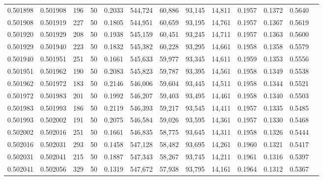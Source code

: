 \begin{tabular}{rrrrrrrrrrrrr}
0.501898 & 0.501908 & 196 &  50 &                                     0.2033 & 544,724 &  60,886 &  93,145 &  14,811 & 0.1957 & 0.1372 & 0.5640 \\
0.501908 & 0.501919 & 227 &  50 &                                     0.1805 & 544,951 &  60,659 &  93,195 &  14,761 & 0.1957 & 0.1367 & 0.5619 \\
0.501920 & 0.501929 & 208 &  50 &                                     0.1938 & 545,159 &  60,451 &  93,245 &  14,711 & 0.1957 & 0.1363 & 0.5600 \\
0.501929 & 0.501940 & 223 &  50 &                                     0.1832 & 545,382 &  60,228 &  93,295 &  14,661 & 0.1958 & 0.1358 & 0.5579 \\
0.501940 & 0.501951 & 251 &  50 &                                     0.1661 & 545,633 &  59,977 &  93,345 &  14,611 & 0.1959 & 0.1353 & 0.5556 \\
0.501951 & 0.501962 & 190 &  50 &                                     0.2083 & 545,823 &  59,787 &  93,395 &  14,561 & 0.1958 & 0.1349 & 0.5538 \\
0.501962 & 0.501972 & 183 &  50 &                                     0.2146 & 546,006 &  59,604 &  93,445 &  14,511 & 0.1958 & 0.1344 & 0.5521 \\
0.501972 & 0.501983 & 201 &  50 &                                     0.1992 & 546,207 &  59,403 &  93,495 &  14,461 & 0.1958 & 0.1340 & 0.5503 \\
0.501983 & 0.501993 & 186 &  50 &                                     0.2119 & 546,393 &  59,217 &  93,545 &  14,411 & 0.1957 & 0.1335 & 0.5485 \\
0.501993 & 0.502002 & 191 &  50 &                                     0.2075 & 546,584 &  59,026 &  93,595 &  14,361 & 0.1957 & 0.1330 & 0.5468 \\
0.502002 & 0.502016 & 251 &  50 &                                     0.1661 & 546,835 &  58,775 &  93,645 &  14,311 & 0.1958 & 0.1326 & 0.5444 \\
0.502016 & 0.502031 & 293 &  50 &                                     0.1458 & 547,128 &  58,482 &  93,695 &  14,261 & 0.1960 & 0.1321 & 0.5417 \\
0.502031 & 0.502041 & 215 &  50 &                                     0.1887 & 547,343 &  58,267 &  93,745 &  14,211 & 0.1961 & 0.1316 & 0.5397 \\
0.502041 & 0.502056 & 329 &  50 &                                     0.1319 & 547,672 &  57,938 &  93,795 &  14,161 & 0.1964 & 0.1312 & 0.5367 \\

\end{tabular}
